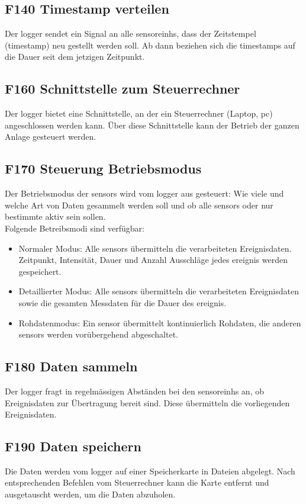 \subsection{F140 Timestamp verteilen}
Der \gls{logger} sendet ein Signal an alle \glspl{sensoreinh}, dass der Zeitstempel (\gls{timestamp}) neu gestellt werden soll. Ab dann beziehen sich die \gls{timestamp}s auf die Dauer seit dem jetzigen Zeitpunkt.


\subsection{F160 Schnittstelle zum Steuerrechner}
Der \gls{logger} bietet eine Schnittstelle, an der ein Steuerrechner (Laptop, \gls{pc}) angeschlossen werden kann. Über diese Schnittstelle kann der Betrieb der ganzen Anlage gesteuert werden.


\subsection{F170 Steuerung Betriebsmodus}
Der Betriebsmodus der \glspl{sensor} wird vom \gls{logger} aus gesteuert: Wie viele und welche Art von Daten gesammelt werden soll und ob alle \glspl{sensor} oder nur bestimmte aktiv sein sollen. \\
Folgende Betreibsmodi sind verfügbar:
\begin{itemize}
\item Normaler Modus: Alle \glspl{sensor} übermitteln die verarbeiteten Ereignisdaten. Zeitpunkt, Intensität, Dauer und Anzahl Ausschläge jedes \gls{ereignis} werden gespeichert.
\item Detaillierter Modus: Alle \glspl{sensor} übermitteln die verarbeiteten Ereignisdaten sowie die gesamten Messdaten für die Dauer des \gls{ereignis}.
\item Rohdatenmodus: Ein \gls{sensor} übermittelt kontinuierlich Rohdaten, die anderen \glspl{sensor} werden vorübergehend abgeschaltet.
\end{itemize}


\subsection{F180 Daten sammeln}
Der \gls{logger} fragt in regelmässigen Abständen bei den \glspl{sensoreinh} an, ob Ereignisdaten zur Übertragung bereit sind. Diese übermitteln die vorliegenden Ereignisdaten.


\subsection{F190 Daten speichern}
Die Daten werden vom \gls{logger} auf einer Speicherkarte in Dateien abgelegt. Nach entsprechenden Befehlen vom Steuerrechner kann die Karte entfernt und ausgetauscht werden, um die Daten abzuholen.


